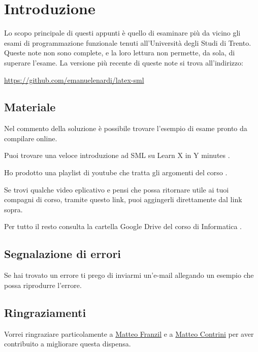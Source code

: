 \section*{Introduzione}

Lo scopo principale di questi appunti è quello di esaminare più da vicino gli esami di programmazione funzionale tenuti all'Università degli Studi di Trento. Queste note non sono complete, e la loro lettura non permette, da sola, di superare l’esame. La versione più recente di queste note si trova all'indirizzo:

\begin{center}
	\url{https://github.com/emanuelenardi/latex-sml}
\end{center}

\subsection*{Materiale}

Nel commento della soluzione è possibile trovare l'esempio di esame pronto da compilare online.

Puoi trovare una veloce introduzione ad SML su Learn X in Y minutes %
\href{https://learnxinyminutes.com/docs/standard-ml/}{\ExternalLink}.

Ho prodotto una playlist di youtube che tratta gli argomenti del corso %
\href{bit.ly/sml-youtube-playlist}{\ExternalLink}.

Se trovi qualche video eplicativo e pensi che possa ritornare utile ai tuoi compagni di corso, tramite questo link, puoi aggingerli direttamente dal link sopra.

Per tutto il resto consulta la cartella Google Drive del corso di Informatica %
\href{https://bit.ly/drive-folder}{\ExternalLink}.

\subsection*{Segnalazione di errori}

Se hai trovato un errore ti prego di inviarmi un'e-mail \href{mailto:emanuele.nardi@studenti.unitn.it}{\ExternalLink} allegando un esempio che possa riprodurre l'errore.

\subsection*{Ringraziamenti}

Vorrei ringraziare particolamente a \href{https://github.com/mfranzil}{Matteo Franzil} e a \href{https://github.com/matteocontrini}{Matteo Contrini} per aver contribuito a migliorare questa dispensa.
